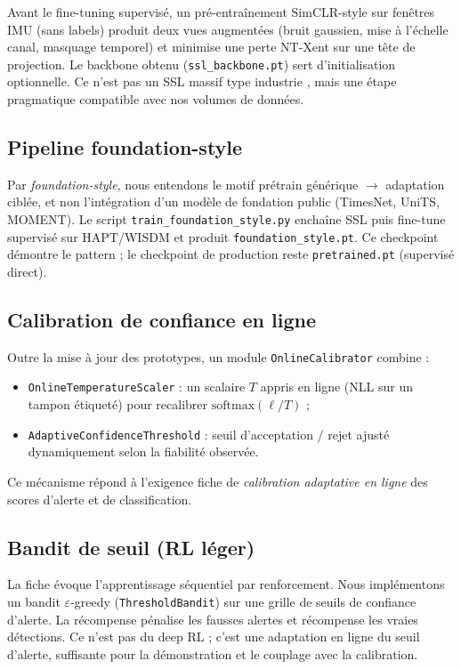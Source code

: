 \documentclass[a4paper,12pt]{report}
\begin{document}
Avant le fine-tuning supervisé, un pré-entraînement SimCLR-style sur fenêtres
IMU (sans labels) produit deux vues augmentées (bruit gaussien, mise à
l'échelle canal, masquage temporel) et minimise une perte NT-Xent sur une
tête de projection. Le backbone obtenu (\texttt{ssl\_backbone.pt}) sert
d'initialisation optionnelle. Ce n'est pas un SSL massif type industrie
\parencite{yuan2024}, mais une étape pragmatique compatible avec nos volumes
de données.

\subsection{Pipeline foundation-style}

Par \emph{foundation-style}, nous entendons le motif
prétrain générique $\rightarrow$ adaptation ciblée, et non l'intégration d'un
modèle de fondation public (TimesNet, UniTS, MOMENT). Le script
\texttt{train\_foundation\_style.py} enchaîne SSL puis fine-tune supervisé
sur HAPT/WISDM et produit \texttt{foundation\_style.pt}. Ce checkpoint
démontre le pattern ; le checkpoint de production reste
\texttt{pretrained.pt} (supervisé direct).

\subsection{Calibration de confiance en ligne}

Outre la mise à jour des prototypes, un module
\texttt{OnlineCalibrator} combine :
\begin{itemize}
  \item \texttt{OnlineTemperatureScaler} : un scalaire $T$ appris en ligne
  (NLL sur un tampon étiqueté) pour recalibrer $\mathrm{softmax}(\ell/T)$ ;
  \item \texttt{AdaptiveConfidenceThreshold} : seuil d'acceptation / rejet
  ajusté dynamiquement selon la fiabilité observée.
\end{itemize}
Ce mécanisme répond à l'exigence fiche de \emph{calibration adaptative en ligne}
des scores d'alerte et de classification.

\subsection{Bandit de seuil (RL léger)}

La fiche évoque l'apprentissage séquentiel par renforcement. Nous
implémentons un bandit $\varepsilon$-greedy (\texttt{ThresholdBandit}) sur une
grille de seuils de confiance d'alerte. La récompense pénalise les fausses
alertes et récompense les vraies détections. Ce n'est pas du deep RL ; c'est
une adaptation en ligne du seuil d'alerte, suffisante pour la démonstration
et le couplage avec la calibration.
\end{document}
